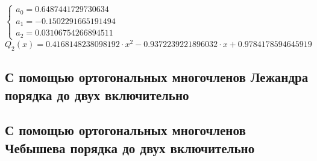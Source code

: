 $
 \begin{cases}
  a_0 = 0.6487441729730634
\\
  a_1 = -0.1502291665191494
\\
  a_2 = 0.03106754266894511
 \end{cases}
$\\[1mm]

\begin{displaymath}
Q_2(x) = 0.4168148238098192 \cdot x^2 - 0.9372239221896032 \cdot x + 0.9784178594645919
\end{displaymath}

\subsection{С помощью ортогональных многочленов Лежандра порядка до двух включительно}



\subsection{С помощью ортогональных многочленов Чебышева порядка до двух включительно}



